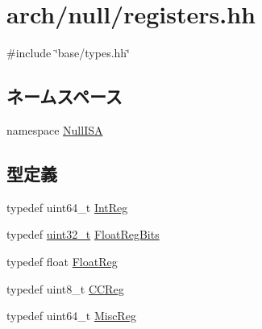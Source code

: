 \hypertarget{null_2registers_8hh}{
\section{arch/null/registers.hh}
\label{null_2registers_8hh}
}
{\ttfamily \#include \char`\"{}base/types.hh\char`\"{}}\par
\subsection*{ネームスペース}
\begin{DoxyCompactItemize}
\item 
namespace \hyperlink{namespaceNullISA}{NullISA}
\end{DoxyCompactItemize}
\subsection*{型定義}
\begin{DoxyCompactItemize}
\item 
typedef uint64\_\-t \hyperlink{namespaceNullISA_a0e080577527fb3e9685399f75b5caf15}{IntReg}
\item 
typedef \hyperlink{Type_8hh_a435d1572bf3f880d55459d9805097f62}{uint32\_\-t} \hyperlink{namespaceNullISA_acc2693113a7cf1a4ff1c9d63b7de6451}{FloatRegBits}
\item 
typedef float \hyperlink{namespaceNullISA_a449d6bb660f5ca613cf359f05d81a20f}{FloatReg}
\item 
typedef uint8\_\-t \hyperlink{namespaceNullISA_a5834599c0196ce4accda8049e7320621}{CCReg}
\item 
typedef uint64\_\-t \hyperlink{namespaceNullISA_aa16539aa6584fd12f7d6fa868f75b4de}{MiscReg}
\end{DoxyCompactItemize}

